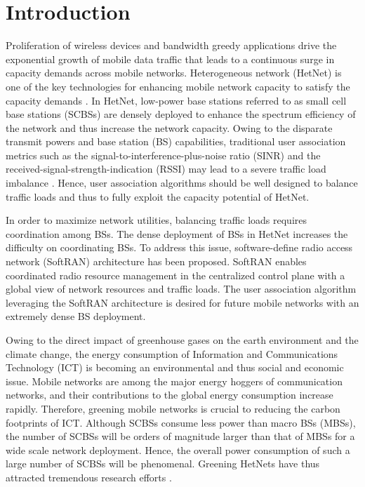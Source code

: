\documentclass[journal]{IEEEtran}
\theoremstyle{definition}
\begin{document}
\section{Introduction}
\label{sec:introduction}
Proliferation of wireless devices and bandwidth greedy applications drive the exponential growth of mobile data traffic that leads to a continuous surge in capacity demands across mobile networks. Heterogeneous network (HetNet) is one of the key technologies for enhancing mobile network capacity to satisfy the capacity demands \cite{Andrews:2014:AOLB}. In HetNet, low-power base stations referred to as small cell base stations (SCBSs) are densely deployed to enhance the spectrum efficiency of the network and thus increase the network capacity. Owing to the disparate transmit powers and base station (BS) capabilities, traditional user association metrics such as the signal-to-interference-plus-noise ratio (SINR) and the received-signal-strength-indication (RSSI) may lead to a severe traffic load imbalance \cite{Andrews:2014:AOLB}. Hence, user association algorithms should be well designed to balance traffic loads and thus to fully exploit the capacity potential of HetNet.

In order to maximize network utilities, balancing traffic loads requires coordination among BSs. The dense deployment of BSs in HetNet increases the difficulty on coordinating BSs. To address this issue, software-define radio access network (SoftRAN) architecture \cite{Gudipati:2013:SSD} has been proposed. SoftRAN enables coordinated radio resource management in the centralized control plane with a global view of network resources and traffic loads. The user association algorithm leveraging the SoftRAN architecture is desired for future mobile networks with an extremely dense BS deployment.

Owing to the direct impact of greenhouse gases on the earth environment and the climate change, the energy consumption of Information and Communications Technology (ICT) is becoming an environmental and thus social and economic issue. Mobile networks are among the major energy hoggers of communication networks, and their contributions to the global energy consumption increase rapidly. Therefore, greening mobile networks is crucial to reducing the carbon footprints of ICT. Although SCBSs consume less power than macro BSs (MBSs), the number of SCBSs will be orders of magnitude larger than that of MBSs for a wide scale network deployment. Hence, the overall power consumption of such a large number of SCBSs will be phenomenal. Greening HetNets have thus attracted tremendous research efforts \cite{Han:2012:OGC,Hasan:2011:GCN}.
\end{document}
